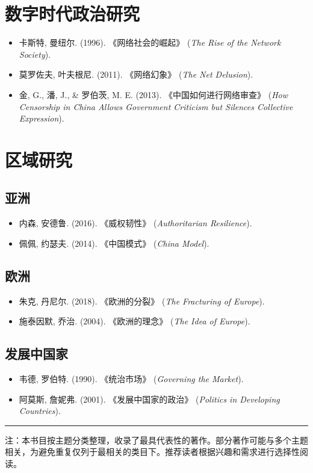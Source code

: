 \documentclass[a5paper, 11pt, openany]{ctexbook}
\begin{document}
\section*{数字时代政治研究}
\begin{itemize}
    \item 卡斯特, 曼纽尔. (1996). 《网络社会的崛起》 (\textit{The Rise of the Network Society}).
    \item 莫罗佐夫, 叶夫根尼. (2011). 《网络幻象》 (\textit{The Net Delusion}).
    \item 金, G., 潘, J., \& 罗伯茨, M. E. (2013). 《中国如何进行网络审查》 (\textit{How Censorship in China Allows Government Criticism but Silences Collective Expression}).
\end{itemize}

\section*{区域研究}

\subsection*{亚洲}
\begin{itemize}
    \item 内森, 安德鲁. (2016). 《威权韧性》 (\textit{Authoritarian Resilience}).
    \item 佩佩, 约瑟夫. (2014). 《中国模式》 (\textit{China Model}).
\end{itemize}

\subsection*{欧洲}
\begin{itemize}
    \item 朱克, 丹尼尔. (2018). 《欧洲的分裂》 (\textit{The Fracturing of Europe}).
    \item 施泰因默, 乔治. (2004). 《欧洲的理念》 (\textit{The Idea of Europe}).
\end{itemize}

\subsection*{发展中国家}
\begin{itemize}
    \item 韦德, 罗伯特. (1990). 《统治市场》 (\textit{Governing the Market}).
    \item 阿莫斯, 詹妮弗. (2001). 《发展中国家的政治》 (\textit{Politics in Developing Countries}).
\end{itemize}

\bigskip
\hrule
\bigskip
\begin{center}
注：本书目按主题分类整理，收录了最具代表性的著作。部分著作可能与多个主题相关，为避免重复仅列于最相关的类目下。推荐读者根据兴趣和需求进行选择性阅读。
\end{center}
\end{document}
